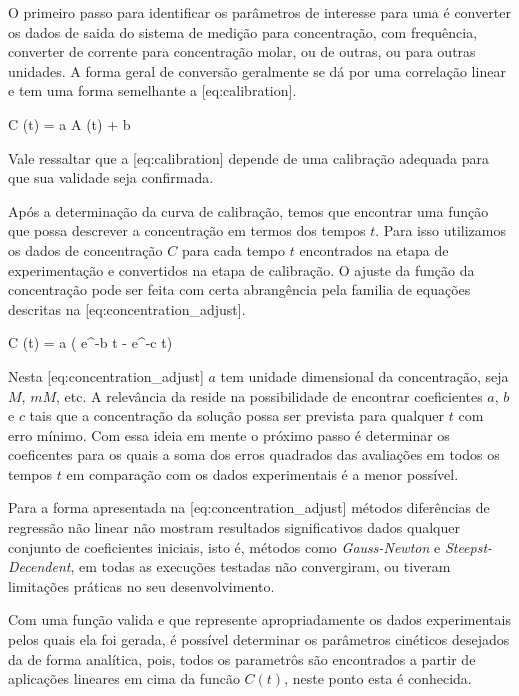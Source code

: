 \startchapter[title={Parâmetros Cinéticos}]
    O primeiro passo para identificar os parâmetros de interesse para uma \DTR é converter os dados de saida do sistema de medição para concentração, com frequência, converter de corrente para concentração molar, ou de outras, ou para outras unidades. A forma geral de conversão geralmente se dá por uma correlação linear e tem uma forma semelhante a [eq:calibration].

    \startplaceformula[reference=eq:calibration]
        \startformula
            C (t) = a A (t) + b
        \stopformula
    \stopplaceformula

    Vale ressaltar que a [eq:calibration] depende de uma calibração adequada para que sua validade seja confirmada.

    Após a determinação da curva de calibração, temos que encontrar uma função que possa descrever a concentração em termos dos tempos $t$. Para isso utilizamos os dados de concentração $C$ para cada tempo $t$ encontrados na etapa de experimentação e convertidos na etapa de calibração. O ajuste da função da concentração pode ser feita com certa abrangência pela familia de equações descritas na [eq:concentration_adjust].

    \startplaceformula[reference=eq:concentration_adjust]
        \startformula
            C (t) = a \left( e^{-b t} - e^{-c t}\right)
        \stopformula
    \stopplaceformula

    Nesta [eq:concentration_adjust] $a$ tem unidade dimensional da concentração, seja $M$, $mM$, etc. A relevância da  reside na possibilidade de encontrar coeficientes $a$, $b$ e $c$ tais que a concentração da solução possa ser prevista para qualquer $t$ com erro mínimo. Com essa ideia em mente o próximo passo é determinar os coeficentes para os quais a soma dos erros quadrados das avaliações em todos os tempos $t$ em comparação com os dados experimentais é a menor possível.

    Para a forma apresentada na [eq:concentration_adjust] métodos diferências de regressão não linear não mostram resultados significativos dados qualquer conjunto de coeficientes iniciais, isto é, métodos como {\it Gauss-Newton} e {\it Steepst-Decendent}, em todas as execuções testadas não convergiram, ou tiveram limitações práticas no seu desenvolvimento.

    Com uma função valida e que represente apropriadamente os dados experimentais pelos quais ela foi gerada, é possível determinar os parâmetros cinéticos desejados da \DTR de forma analítica, pois, todos os parametrôs são encontrados a partir de aplicações lineares em cima da funcão $C (t)$, neste ponto esta é conhecida.

